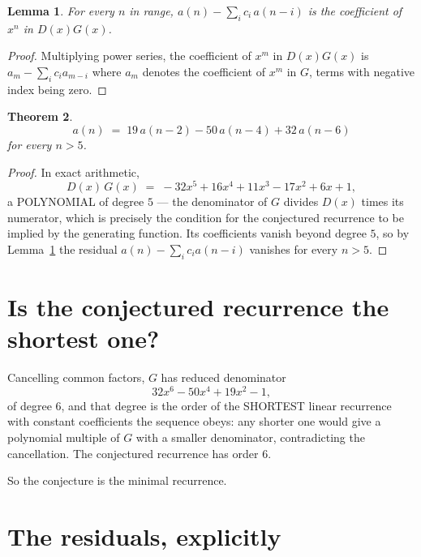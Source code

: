 \documentclass[11pt,a4paper]{article}
\theoremstyle{plain}
\newtheorem{theorem}{Theorem}
\newtheorem{lemma}[theorem]{Lemma}
\theoremstyle{definition}
\begin{document}
\begin{lemma}\label{lem:key}
For every $n$ in range, $a(n)-\sum_i c_i\,a(n-i)$ is the coefficient of $x^{n}$ in
$D(x)G(x)$.
\end{lemma}

\begin{proof}
Multiplying power series, the coefficient of $x^{m}$ in $D(x)G(x)$ is
$a_m-\sum_i c_i a_{m-i}$ where $a_m$ denotes the coefficient of $x^{m}$ in $G$, terms with
negative index being zero.
\end{proof}

\begin{theorem}
\[
a(n)\;=\;19\,a(n-2) - 50\,a(n-4) + 32\,a(n-6)
\]
for every $n>5$.
\end{theorem}

\begin{proof}
In exact arithmetic,
\[
D(x)\,G(x)\;=\;- 32 x^{5} + 16 x^{4} + 11 x^{3} - 17 x^{2} + 6 x + 1,
\]
a POLYNOMIAL of degree $5$ --- the denominator of $G$ divides $D(x)$ times its numerator,
which is precisely the condition for the conjectured recurrence to be implied by the
generating function. Its coefficients vanish beyond degree $5$, so by
Lemma~\ref{lem:key} the residual $a(n)-\sum_ic_ia(n-i)$ vanishes for every
$n>5$.
\end{proof}

\section{Is the conjectured recurrence the shortest one?}

Cancelling common factors, $G$ has reduced denominator
\[
32 x^{6} - 50 x^{4} + 19 x^{2} - 1,
\]
of degree $6$, and that degree is the order of the SHORTEST linear recurrence with
constant coefficients the sequence obeys: any shorter one would give a polynomial multiple of
$G$ with a smaller denominator, contradicting the cancellation. The conjectured recurrence has
order $6$.

So the conjecture is the minimal recurrence.

\section{The residuals, explicitly}
\end{document}
